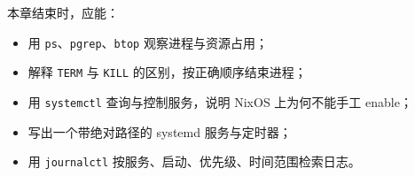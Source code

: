 \begin{checkpoint}
本章结束时，应能：
\begin{itemize}
  \item 用 \texttt{ps}、\texttt{pgrep}、\texttt{btop} 观察进程与资源占用；
  \item 解释 \texttt{TERM} 与 \texttt{KILL} 的区别，按正确顺序结束进程；
  \item 用 \texttt{systemctl} 查询与控制服务，说明 NixOS 上为何不能手工 enable；
  \item 写出一个带绝对路径的 systemd 服务与定时器；
  \item 用 \texttt{journalctl} 按服务、启动、优先级、时间范围检索日志。
\end{itemize}
\end{checkpoint}
